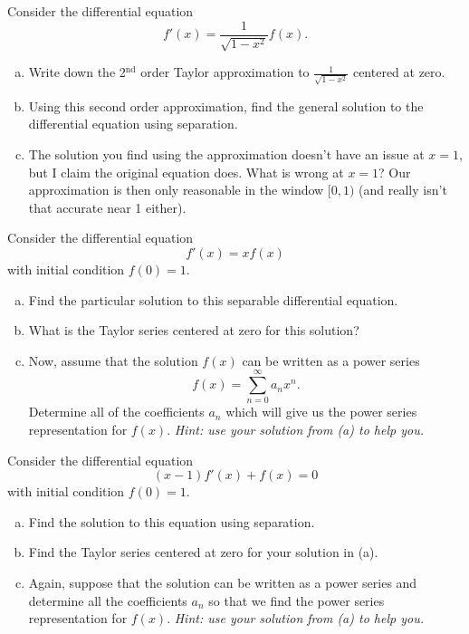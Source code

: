 \begin{problem}
Consider the differential equation
\[
f'(x) = \frac{1}{\sqrt{1-x^2}} f(x).
\]
\begin{enumerate}[(a)]
    \item Write down the 2$^\textrm{nd}$ order Taylor approximation to $\frac{1}{\sqrt{1-x^2}}$ centered at zero.
    \item Using this second order approximation, find the general solution to the differential equation using separation.
    \item The solution you find using the approximation doesn't have an issue at $x=1$, but I claim the original equation does.  What is wrong at $x=1$? Our approximation is then only reasonable in the window $[0,1)$ (and really isn't that accurate near 1 either).
\end{enumerate}
\end{problem}

\begin{problem}
Consider the differential equation
\[
f'(x)=xf(x)
\]
with initial condition $f(0)=1$.
\begin{enumerate}[(a)]
    \item Find the particular solution to this separable differential equation.
    \item What is the Taylor series centered at zero for this solution?
    \item Now, assume that the solution $f(x)$ can be written as a power series
    \[
    f(x) = \sum_{n=0}^\infty a_n x^n.
    \]
    Determine all of the coefficients $a_n$ which will give us the power series representation for $f(x)$. \emph{Hint: use your solution from (a) to help you.}
\end{enumerate}
\end{problem}

\begin{problem}
Consider the differential equation
\[
(x-1)f'(x) + f(x)=0
\]
with initial condition $f(0)=1$.
\begin{enumerate}[(a)]
    \item Find the solution to this equation using separation.
    \item Find the Taylor series centered at zero for your solution in (a).
    \item Again, suppose that the solution can be written as a power series and determine all the coefficients $a_n$ so that we find the power series representation for $f(x)$. \emph{Hint: use your solution from (a) to help you.}
\end{enumerate}
\end{problem}

